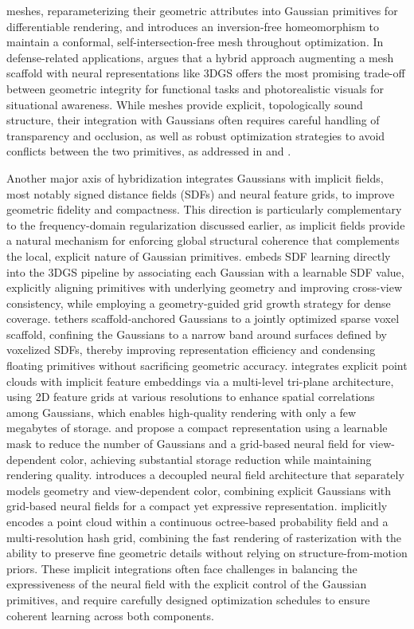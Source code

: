 \documentclass[11pt]{article}
\begin{document}
meshes, reparameterizing their geometric attributes into Gaussian primitives for differentiable rendering, and introduces an inversion-free homeomorphism to maintain a conformal, self-intersection-free mesh throughout optimization. In defense-related applications, \cite{ref93} argues that a hybrid approach augmenting a mesh scaffold with neural representations like 3DGS offers the most promising trade-off between geometric integrity for functional tasks and photorealistic visuals for situational awareness. While meshes provide explicit, topologically sound structure, their integration with Gaussians often requires careful handling of transparency and occlusion, as well as robust optimization strategies to avoid conflicts between the two primitives, as addressed in \cite{ref84} and \cite{ref47}.

Another major axis of hybridization integrates Gaussians with implicit fields, most notably signed distance fields (SDFs) and neural feature grids, to improve geometric fidelity and compactness. This direction is particularly complementary to the frequency-domain regularization discussed earlier, as implicit fields provide a natural mechanism for enforcing global structural coherence that complements the local, explicit nature of Gaussian primitives. \cite{ref94} embeds SDF learning directly into the 3DGS pipeline by associating each Gaussian with a learnable SDF value, explicitly aligning primitives with underlying geometry and improving cross-view consistency, while employing a geometry-guided grid growth strategy for dense coverage. \cite{ref95} tethers scaffold-anchored Gaussians to a jointly optimized sparse voxel scaffold, confining the Gaussians to a narrow band around surfaces defined by voxelized SDFs, thereby improving representation efficiency and condensing floating primitives without sacrificing geometric accuracy. \cite{ref96} integrates explicit point clouds with implicit feature embeddings via a multi-level tri-plane architecture, using 2D feature grids at various resolutions to enhance spatial correlations among Gaussians, which enables high-quality rendering with only a few megabytes of storage. \cite{ref97} and \cite{ref98} propose a compact representation using a learnable mask to reduce the number of Gaussians and a grid-based neural field for view-dependent color, achieving substantial storage reduction while maintaining rendering quality. \cite{ref99} introduces a decoupled neural field architecture that separately models geometry and view-dependent color, combining explicit Gaussians with grid-based neural fields for a compact yet expressive representation. \cite{ref100} implicitly encodes a point cloud within a continuous octree-based probability field and a multi-resolution hash grid, combining the fast rendering of rasterization with the ability to preserve fine geometric details without relying on structure-from-motion priors. These implicit integrations often face challenges in balancing the expressiveness of the neural field with the explicit control of the Gaussian primitives, and require carefully designed optimization schedules to ensure coherent learning across both components.
\end{document}
